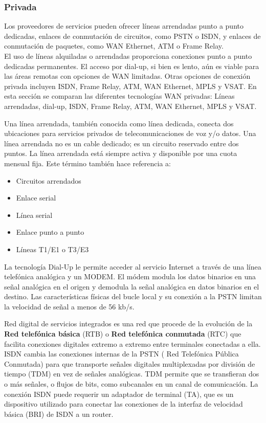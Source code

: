 \documentclass[
	12pt, %
	fleqn, %
	a4paper, %
	oneside, %
]{LegrandOrangeBook}
\begin{document}
\subsubsection{Privada}
Los proveedores de servicios pueden ofrecer líneas arrendadas punto a punto dedicadas, enlaces de conmutación de circuitos, como PSTN o ISDN, y enlaces de conmutación de paquetes, como WAN Ethernet, ATM o Frame Relay.\\
El uso de líneas alquiladas o arrendadas proporciona conexiones punto a punto dedicadas permanentes. El acceso por dial-up, si bien es lento, aún es viable para las áreas remotas con opciones de WAN limitadas. Otras opciones de conexión privada incluyen ISDN, Frame Relay, ATM, WAN Ethernet, MPLS y VSAT. En esta sección se comparan las diferentes tecnologías WAN privadas: Líneas arrendadas, dial-up, ISDN, Frame Relay, ATM, WAN Ethernet, MPLS y VSAT.
\begin{vocabulary}
Una línea arrendada, también conocida como línea dedicada, conecta dos ubicaciones para servicios privados de telecomunicaciones de voz y/o datos. Una línea arrendada no es un cable dedicado; es un circuito reservado entre dos puntos. La línea arrendada está siempre activa y disponible por una cuota mensual fija. Este término también hace referencia a:
\begin{itemize}
\item Circuitos arrendados
\item Enlace serial
\item Línea serial
\item Enlace punto a punto
\item Líneas T1/E1 o T3/E3
\end{itemize}
\end{vocabulary}
\begin{vocabulary}[Dial Up]
La tecnología Dial-Up le permite acceder al servicio Internet a través de una línea telefónica analógica y un MODEM. El módem modula los datos binarios en una  señal analógica en el origen y demodula la señal  analógica en datos binarios en el destino. Las características físicas del bucle local y su  conexión a la PSTN limitan la velocidad de señal  a menos de 56 kb/s.
\end{vocabulary}
\begin{vocabulary}[ISDN]
Red digital de servicios integrados es una red que procede de la evolución de la \textbf{Red telefónica básica} (RTB) o  \textbf{Red telefónica conmutada} (RTC) que facilita conexiones digitales extremo a extremo entre terminales conectadas a ella.\\
ISDN cambia las conexiones internas de la  PSTN ( Red Telefónica Pública Conmutada) para que transporte señales digitales  multiplexadas por división de tiempo (TDM) en  vez de señales analógicas. TDM permite que se transfieran dos o más  señales, o flujos de bits, como subcanales en  un canal de comunicación. La conexión ISDN puede requerir un adaptador  de terminal (TA), que es un dispositivo utilizado  para conectar las conexiones de la interfaz de  velocidad básica (BRI) de ISDN a un router.
\end{vocabulary}
\end{document}
